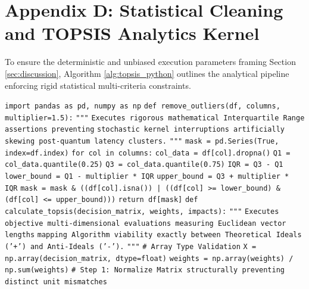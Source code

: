 \section*{Appendix D: Statistical Cleaning and TOPSIS Analytics Kernel}
\label{app:topsis_code}

To ensure the deterministic and unbiased execution parameters framing Section \ref{sec:discussion}, Algorithm \ref{alg:topsis_python} outlines the analytical pipeline enforcing rigid statistical multi-criteria constraints.

\begin{algorithm*}[htbp]
\caption{Unsupervised IQR Validation and Multi-Criteria Evaluation (Python 3)}\label{alg:topsis_python}
\begin{algorithmic}[1]
\State \texttt{import pandas as pd, numpy as np}
\State
\State \texttt{def remove\_outliers(df, columns, multiplier=1.5):}
\State \indent \texttt{"""}
\State \indent \texttt{Executes rigorous mathematical Interquartile Range assertions preventing}
\State \indent \texttt{stochastic kernel interruptions artificially skewing post-quantum latency clusters.}
\State \indent \texttt{"""}
\State \indent \texttt{mask = pd.Series(True, index=df.index)}
\State \indent \texttt{for col in columns:}
\State \indent \indent \texttt{col\_data = df[col].dropna()}
\State \indent \indent \texttt{Q1 = col\_data.quantile(0.25)}
\State \indent \indent \texttt{Q3 = col\_data.quantile(0.75)}
\State \indent \indent \texttt{IQR = Q3 - Q1}
\State \indent \indent \texttt{lower\_bound = Q1 - multiplier * IQR}
\State \indent \indent \texttt{upper\_bound = Q3 + multiplier * IQR}
\State \indent \indent \texttt{mask = mask \& ((df[col].isna()) | ((df[col] >= lower\_bound) \& (df[col] <= upper\_bound)))}
\State \indent \texttt{return df[mask]}
\State
\State \texttt{def calculate\_topsis(decision\_matrix, weights, impacts):}
\State \indent \texttt{"""}
\State \indent \texttt{Executes objective multi-dimensional evaluations measuring Euclidean vector lengths}
\State \indent \texttt{mapping Algorithm viability exactly between Theoretical Ideals ('+') and Anti-Ideals ('-').}
\State \indent \texttt{"""}
\State \indent \texttt{\# Array Type Validation}
\State \indent \texttt{X = np.array(decision\_matrix, dtype=float)}
\State \indent \texttt{weights = np.array(weights) / np.sum(weights)}
\State
\State \indent \texttt{\# Step 1: Normalize Matrix structurally preventing distinct unit mismatches}

\end{algorithmic}
\end{algorithm*}
